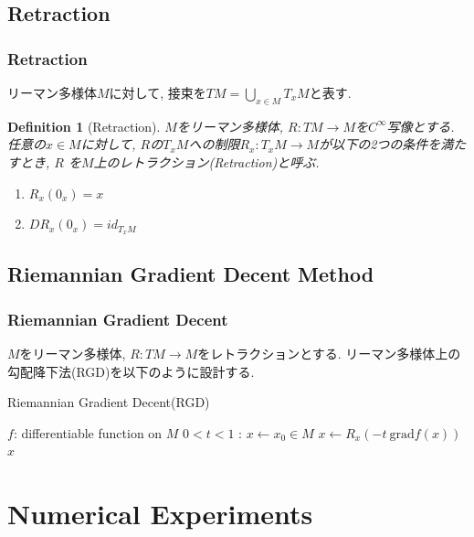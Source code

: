 \documentclass[dvipdfmx,11pt]{beamer}		%
\newtheorem{defi}{Definition}
\newcommand{\tpm}{T_xM}
\begin{document}
    \subsection{Retraction}
    \begin{frame}\frametitle{Retraction}
        リーマン多様体$M$に対して, 接束を$\displaystyle TM = \bigcup_{x\in M}\tpm$と表す.
        \begin{defi}[Retraction]
            $M$をリーマン多様体, $R : TM\to M$を$C^\infty$写像とする. 
            任意の$x\in M$に対して, $R$の$\tpm$への制限$R_x : \tpm\to M$が以下の2つの条件を満たすとき, $R$
            を$M$上のレトラクション(Retraction)と呼ぶ.
            \begin{enumerate}
                \item $R_x(0_x) = x$
                \item $DR_x(0_x) = id_{\tpm}$
            \end{enumerate}
        \end{defi}
    \end{frame}


    \subsection{Riemannian Gradient Decent Method}
    
    \begin{frame}\frametitle{Riemannian Gradient Decent}
        $M$をリーマン多様体, $R : TM\to M$をレトラクションとする.
        リーマン多様体上の勾配降下法(RGD)を以下のように設計する.
        \begin{algorithm}[H]
            \caption{Riemannian Gradient Decent(RGD)}
            \begin{algorithmic}
                \REQUIRE $f$: differentiable function on $M$
                \REQUIRE $0< t <1$ : 
                \STATE $x\leftarrow x_{0}\in M$
                \STATE $x\leftarrow R_x(-t~\mathrm{grad} f(x))$ 
                \ENDWHILE
                \RETURN $x$
            \end{algorithmic}
        \end{algorithm}
    \end{frame}
    \section{Numerical Experiments}
    
\end{document}
